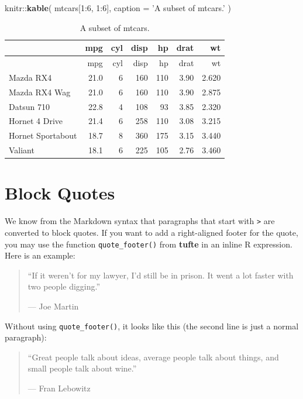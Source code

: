 \documentclass[]{tufte-handout}
\newenvironment{Shaded}{}{}
\newcommand{\DataTypeTok}[1]{\textcolor[rgb]{0.56,0.13,0.00}{#1}}
\newcommand{\DecValTok}[1]{\textcolor[rgb]{0.25,0.63,0.44}{#1}}
\newcommand{\KeywordTok}[1]{\textcolor[rgb]{0.00,0.44,0.13}{\textbf{#1}}}
\newcommand{\NormalTok}[1]{#1}
\newcommand{\OperatorTok}[1]{\textcolor[rgb]{0.40,0.40,0.40}{#1}}
\newcommand{\StringTok}[1]{\textcolor[rgb]{0.25,0.44,0.63}{#1}}
\begin{document}
\begin{Shaded}
\begin{Highlighting}[]
\NormalTok{knitr}\OperatorTok{::}\KeywordTok{kable}\NormalTok{(}
\NormalTok{  mtcars[}\DecValTok{1}\OperatorTok{:}\DecValTok{6}\NormalTok{, }\DecValTok{1}\OperatorTok{:}\DecValTok{6}\NormalTok{], }\DataTypeTok{caption =} \StringTok{'A subset of mtcars.'}
\NormalTok{)}
\end{Highlighting}
\end{Shaded}

\begin{longtable}[]{@{}lrrrrrr@{}}
\caption{A subset of mtcars.}\tabularnewline
\toprule
& mpg & cyl & disp & hp & drat & wt\tabularnewline
\midrule
\endfirsthead
\toprule
& mpg & cyl & disp & hp & drat & wt\tabularnewline
\midrule
\endhead
Mazda RX4 & 21.0 & 6 & 160 & 110 & 3.90 & 2.620\tabularnewline
Mazda RX4 Wag & 21.0 & 6 & 160 & 110 & 3.90 & 2.875\tabularnewline
Datsun 710 & 22.8 & 4 & 108 & 93 & 3.85 & 2.320\tabularnewline
Hornet 4 Drive & 21.4 & 6 & 258 & 110 & 3.08 & 3.215\tabularnewline
Hornet Sportabout & 18.7 & 8 & 360 & 175 & 3.15 & 3.440\tabularnewline
Valiant & 18.1 & 6 & 225 & 105 & 2.76 & 3.460\tabularnewline
\bottomrule
\end{longtable}

\hypertarget{block-quotes}{%
\section{Block Quotes}\label{block-quotes}}

We know from the Markdown syntax that paragraphs that start with
\texttt{\textgreater{}} are converted to block quotes. If you want to
add a right-aligned footer for the quote, you may use the function
\texttt{quote\_footer()} from \textbf{tufte} in an inline R expression.
Here is an example:

\begin{quote}
``If it weren't for my lawyer, I'd still be in prison. It went a lot
faster with two people digging.''

\hfill --- Joe Martin
\end{quote}

Without using \texttt{quote\_footer()}, it looks like this (the second
line is just a normal paragraph):

\begin{quote}
``Great people talk about ideas, average people talk about things, and
small people talk about wine.''

--- Fran Lebowitz
\end{quote}
\end{document}
